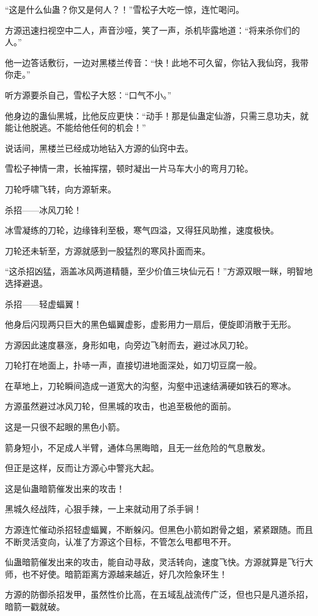 \begin{this_body}
“这是什么仙蛊？你又是何人？！”雪松子大吃一惊，连忙喝问。

方源迅速扫视空中二人，声音沙哑，笑了一声，杀机毕露地道：“将来杀你们的人。”

他一边答话敷衍，一边对黑楼兰传音：“快！此地不可久留，你钻入我仙窍，我带你走。”

听方源要杀自己，雪松子大怒：“口气不小。”

他身边的蛊仙黑城，比他反应更快：“动手！那是仙蛊定仙游，只需三息功夫，就能让他脱逃。不能给他任何的机会！”

说话间，黑楼兰已经成功地钻入方源的仙窍中去。

雪松子神情一肃，长袖挥摆，顿时凝出一片马车大小的弯月刀轮。

刀轮呼啸飞转，向方源斩来。

杀招——冰风刀轮！

冰雪凝练的刀轮，边缘锋利至极，寒气四溢，又得狂风助推，速度极快。

刀轮还未斩至，方源就感到一股猛烈的寒风扑面而来。

“这杀招凶猛，涵盖冰风两道精髓，至少价值三块仙元石！”方源双眼一眯，明智地选择避退。

杀招——轻虚蝠翼！

他身后闪现两只巨大的黑色蝠翼虚影，虚影用力一扇后，便旋即消散于无形。

方源因此速度暴涨，身形如电，向旁边飞射而去，避过冰风刀轮。

刀轮打在地面上，扑哧一声，直接切进地面深处，如刀切豆腐一般。

在草地上，刀轮瞬间造成一道宽大的沟壑，沟壑中迅速结满硬如铁石的寒冰。

方源虽然避过冰风刀轮，但黑城的攻击，也追至极他的面前。

这是一只很不起眼的黑色小箭。

箭身短小，不足成人半臂，通体乌黑晦暗，且无一丝危险的气息散发。

但正是这样，反而让方源心中警兆大起。

这是仙蛊暗箭催发出来的攻击！

黑城久经战阵，心狠手辣，一上来就动用了杀手锏！

方源连忙催动杀招轻虚蝠翼，不断躲闪。但黑色小箭如跗骨之蛆，紧紧跟随。而且不断灵活变向，认准了方源这个目标，不管怎么甩都甩不开。

仙蛊暗箭催发出来的攻击，能自动寻敌，灵活转向，速度飞快。方源就算是飞行大师，也不好使。暗箭距离方源越来越近，好几次险象环生！

方源的防御杀招发甲，虽然性价比高，在五域乱战流传广泛，但也只是凡道杀招，暗箭一戳就破。


\end{this_body}
